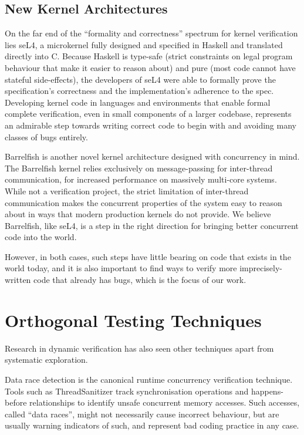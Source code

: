 \subsection{New Kernel Architectures}

On the far end of the ``formality and correctness'' spectrum for kernel verification lies seL4\hspace{0in}\cite{sel4}, a microkernel fully designed and specified in Haskell and translated directly into C. Because Haskell is type-safe (strict constraints on legal program behaviour that make it easier to reason about) and pure (most code cannot have stateful side-effects), the developers of seL4 were able to formally prove the specification's correctness and the implementation's adherence to the spec.
Developing kernel code in languages and environments that enable formal complete verification, even in small components of a larger codebase, represents an admirable step towards writing correct code to begin with and avoiding many classes of bugs entirely.

Barrelfish\cite{barrelfish} is another novel kernel architecture designed with concurrency in mind. The Barrelfish kernel relies exclusively on message-passing for inter-thread communication, for increased performance on massively multi-core systems. While not a verification project, the strict limitation of inter-thread communication makes the concurrent properties of the system easy to reason about in ways that modern production kernels do not provide.
We believe Barrelfish, like seL4, is a step in the right direction for bringing better concurrent code into the world.

However, in both cases, such steps have little bearing on code that exists in the world today, and it is also important to find ways to verify more imprecisely-written code that already has bugs, which is the focus of our work.

\section{Orthogonal Testing Techniques}
\label{sec:related-orthogonal}

Research in dynamic verification has also seen other techniques apart from systematic exploration.

Data race detection is the canonical runtime concurrency verification technique. Tools such as ThreadSanitizer\cite{tsan} track synchronisation operations and happens-before relationships to identify unsafe concurrent memory accesses. Such accesses, called ``data races'', might not necessarily cause incorrect behaviour, but are usually warning indicators of such, and represent bad coding practice in any case.

